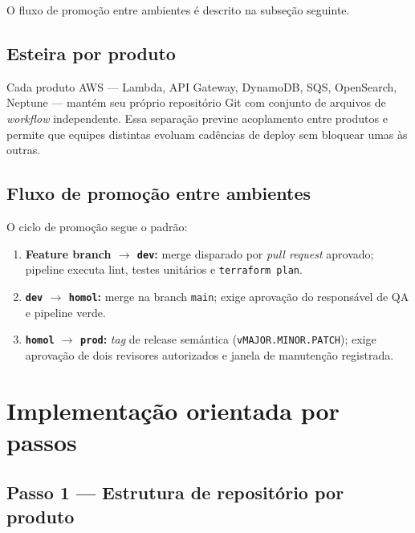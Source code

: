 O fluxo de promo\c{c}\~ao entre ambientes \'e descrito na subse\c{c}\~ao seguinte.

\subsection{Esteira por produto}

Cada produto AWS --- Lambda, API Gateway,
DynamoDB, SQS, OpenSearch,
Neptune --- mant\'em seu pr\'oprio reposit\'orio Git
com conjunto de arquivos de \textit{workflow} independente. Essa separação
previne acoplamento entre produtos e permite que equipes distintas evoluam
cadências de deploy sem bloquear umas às outras.

\subsection{Fluxo de promoção entre ambientes}

O ciclo de promo\c{c}\~ao segue o padr\~ao:

\begin{enumerate}[leftmargin=*]
  \item \textbf{Feature branch $\to$ \texttt{dev}:} merge disparado por
        \textit{pull request} aprovado; pipeline executa
        lint, testes unit\'arios e \texttt{terraform plan}.
  \item \textbf{\texttt{dev} $\to$ \texttt{homol}:} merge na branch
        \texttt{main}; exige aprova\c{c}\~ao do respons\'avel de QA e
        pipeline verde.
  \item \textbf{\texttt{homol} $\to$ \texttt{prod}:} \textit{tag} de
        release sem\'antica
        (\texttt{vMAJOR.MINOR.PATCH}); exige aprova\c{c}\~ao de dois
        revisores autorizados e janela de manuten\c{c}\~ao registrada.
\end{enumerate}

\section{Implementa\c{c}\~ao orientada por passos}

\subsection{Passo 1 --- Estrutura de reposit\'orio por produto}

